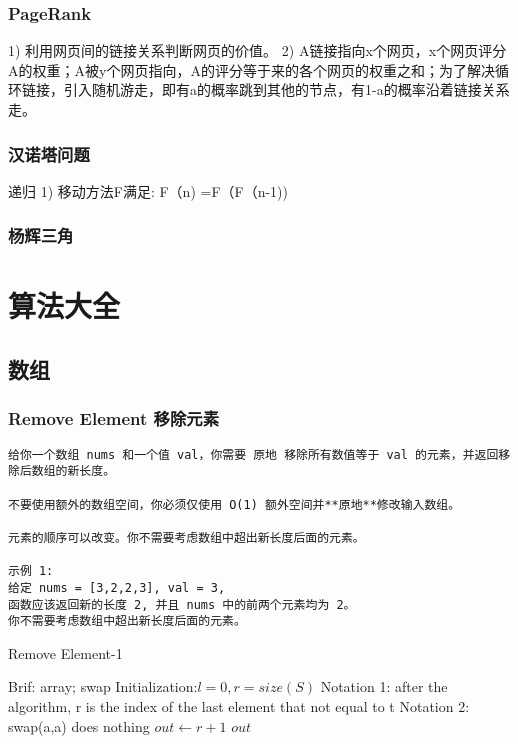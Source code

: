 \documentclass[UTF8]{../computerUniverse}
\begin{document}
\subsection{PageRank}
1) 利用网页间的链接关系判断网页的价值。
2) A链接指向x个网页，x个网页评分A的权重；A被y个网页指向，A的评分等于来的各个网页的权重之和；为了解决循环链接，引入随机游走，即有a的概率跳到其他的节点，有1-a的概率沿着链接关系走。


\subsection{汉诺塔问题}
递归
1) 移动方法F满足: F（n) =F（F（n-1))


\subsection{杨辉三角}


\chapter{算法大全}


\section{数组}
\subsection{Remove Element  移除元素}

\begin{lstlisting}
给你一个数组 nums 和一个值 val，你需要 原地 移除所有数值等于 val 的元素，并返回移除后数组的新长度。

不要使用额外的数组空间，你必须仅使用 O(1) 额外空间并**原地**修改输入数组。

元素的顺序可以改变。你不需要考虑数组中超出新长度后面的元素。

示例 1:
给定 nums = [3,2,2,3], val = 3,
函数应该返回新的长度 2, 并且 nums 中的前两个元素均为 2。
你不需要考虑数组中超出新长度后面的元素。

\end{lstlisting}

\begin{algorithm}[h]%
  \caption{Remove Element-1}\label{algo:Remove Element-1}
  \SetAlgoLined
  Brif: array; swap\;
  Initialization:$l = 0, r = size(S)$\;
  Notation 1: after the algorithm, r is the index of the last element that not equal to t\;
  Notation 2: swap(a,a) does nothing \;
  \KwIn{set $S = [l,r), l = S[0]$,  the removed number $t$.}
  $out \leftarrow r+1$\;
  \KwRet $out$\;
\end{algorithm}
\end{document}
